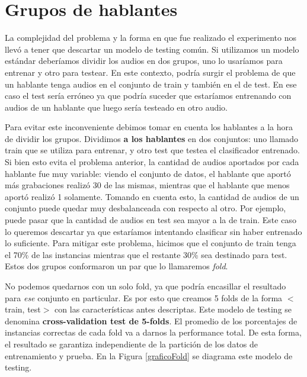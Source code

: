 
\section{Grupos de hablantes}


La complejidad del problema y la forma en que fue realizado el experimento nos llevó a tener que descartar un modelo de testing común. Si utilizamos un modelo estándar deberíamos dividir los audios en dos grupos, uno lo usaríamos para entrenar y otro para testear. En este contexto, podría surgir el problema de que un hablante tenga audios en el conjunto de train y también en el de test. En ese caso el test sería erróneo ya que podría suceder que estaríamos entrenando con audios de un hablante que luego sería testeado en otro audio.

Para evitar este inconveniente debimos tomar en cuenta los hablantes a la hora de dividir los grupos. Dividimos \textbf{a los hablantes} en dos conjuntos: uno llamado train que se utiliza para entrenar, y otro test que testea el clasificador entrenado. Si bien esto evita el problema anterior, la cantidad de audios aportados por cada hablante fue muy variable: viendo el conjunto de datos, el hablante que aportó más grabaciones realizó 30 de las mismas, mientras que el hablante que menos aportó realizó 1 solamente. Tomando en cuenta esto, la cantidad de audios de un conjunto puede quedar muy desbalanceada con respecto al otro. Por ejemplo, puede pasar que la cantidad de audios en test sea mayor a la de train. Este caso lo queremos descartar ya que estaríamos intentando clasificar sin haber entrenado lo suficiente. Para mitigar este problema, hicimos que el conjunto de train tenga el 70\% de las instancias mientras que el restante 30\% sea destinado para test. Estos dos grupos conformaron un par que lo llamaremos \textit{fold}.

No podemos quedarnos con un solo fold, ya que podría encasillar el resultado para \textit{ese} conjunto en particular. Es por esto que creamos 5 folds de la forma $<$train, test$>$ con las características antes descriptas. Este modelo de testing se denomina \textbf{cross-validation test de 5-folds}. El promedio de los porcentajes de instancias correctas de cada fold va a darnos la performance total. De esta forma, el resultado se garantiza independiente de la partición de los datos de entrenamiento y prueba. En la Figura \ref{graficoFold} se diagrama este modelo de testing.

